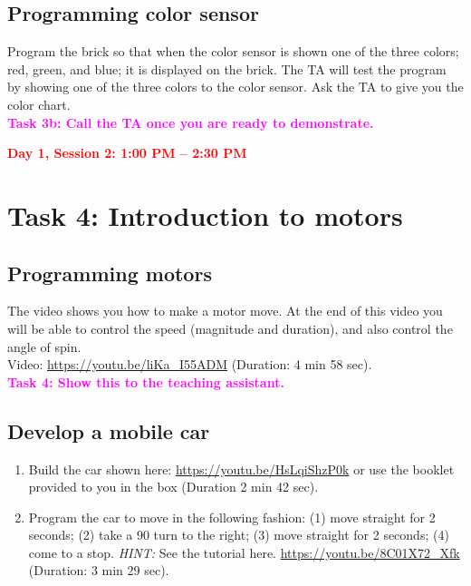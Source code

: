 \documentclass[11pt]{article}
\def\bluehref#1#2{\href{#1}{\color{blue} #2}}
\begin{document}
\subsection*{Programming color sensor}
Program the brick so that when the color sensor is shown one of the three colors; red, green, and blue; it is displayed on the brick. The TA will test the program by showing one of the three colors to the color sensor. Ask the TA to give you the color chart.
\\
 \textcolor{magenta}{\bf Task 3b: Call the TA once you are ready to demonstrate.}


\vspace{0.5cm}
\noindent \textcolor{red}{\bf\Large Day 1, Session 2: 1:00 PM -- 2:30 PM} 
\section*{Task 4: Introduction to motors}
\subsection*{Programming motors}
The video shows you how to make a motor move. At the end of this video you will be able to control the speed (magnitude and duration), and also control the angle of spin. \\ Video:
\bluehref{https://youtu.be/liKa\_I55ADM}{https://youtu.be/liKa\_I55ADM} (Duration: 4 min 58 sec). \\
 \textcolor{magenta}{\bf Task 4: Show this to the teaching assistant.}

\subsection*{Develop a mobile car}

\begin{enumerate}
\item Build the car shown here: \bluehref{https://youtu.be/HsLqiShzP0k}{https://youtu.be/HsLqiShzP0k} or use the booklet provided to you in the box (Duration 2 min 42 sec). 
 \item Program the car to move in the following fashion: (1) move straight for 2 seconds; (2) take a 90 turn to the right; (3) move straight for 2 seconds; (4) come to a stop. {\it HINT:} See the tutorial here.  \bluehref{https://youtu.be/8C01X72\_Xfk}{https://youtu.be/8C01X72\_Xfk} (Duration: 3 min 29 sec).
\end{enumerate}
\end{document}

